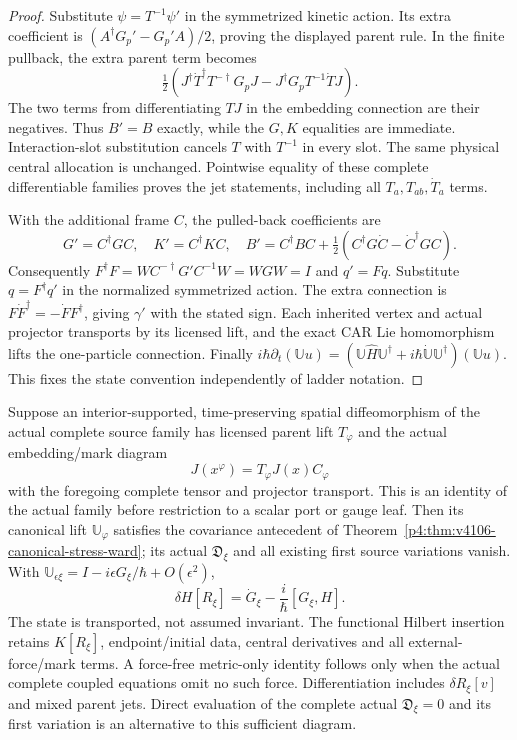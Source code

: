 \documentclass[12pt,a4paper]{article}
\begin{document}
\begin{proof}
Substitute $\psi=T^{-1}\psi'$ in the symmetrized kinetic action. Its
extra coefficient is $(A^\dagger G_p'-G_p'A)/2$, proving the displayed
parent rule. In the finite pullback, the extra parent term becomes
\[
 \tfrac12(J^\dagger\dot T^\dagger T^{-\dagger}G_pJ
                    -J^\dagger G_pT^{-1}\dot TJ).
\]
The two terms from differentiating $TJ$ in the embedding connection
are their negatives. Thus $B'=B$ exactly, while the $G,K$ equalities
are immediate. Interaction-slot substitution cancels $T$ with $T^{-1}$
in every slot. The same physical central allocation is unchanged.
Pointwise equality of these complete differentiable families proves
the jet statements, including all $T_a,T_{ab},\dot T_a$ terms.

With the additional frame $C$, the pulled-back coefficients are
\[
 G'=C^\dagger GC,\quad K'=C^\dagger KC,\quad
 B'=C^\dagger BC+\tfrac12(C^\dagger G\dot C-\dot C^\dagger GC).
\]
Consequently
$F^\dagger F=WC^{-\dagger}G'C^{-1}W=WGW=I$ and $q'=Fq$.
Substitute $q=F^\dagger q'$ in the normalized symmetrized action.
The extra connection is $F\dot F^\dagger=-\dot FF^\dagger$,
giving $\gamma'$ with the stated sign. Each inherited vertex and
actual projector transports by its licensed lift, and the exact CAR
Lie homomorphism lifts the one-particle connection. Finally
$i\hbar\partial_t(\mathbb Uu)=
(\mathbb U\widehat H\mathbb U^\dagger+
i\hbar\dot{\mathbb U}\mathbb U^\dagger)(\mathbb Uu)$.
This fixes the state convention independently of ladder notation.
\end{proof}

\begin{corollary}
\label{p4:cor:v4118-source-bound-spatial-ward}
Suppose an interior-supported, time-preserving spatial diffeomorphism
of the actual complete source family has licensed parent lift $T_\varphi$
and the actual embedding/mark diagram
\[
 J(x^\varphi)=T_\varphi J(x)C_\varphi
\]
with the foregoing complete tensor and projector transport. This is an
identity of the actual family before restriction to a scalar port or
gauge leaf. Then its canonical lift $\mathbb U_\varphi$ satisfies the
covariance antecedent of Theorem~\ref{p4:thm:v4106-canonical-stress-ward};
its actual $\mathfrak D_\xi$ and all existing first source variations
vanish. With $\mathbb U_{\epsilon\xi}=I-i\epsilon G_\xi/\hbar+
O(\epsilon^2)$,
\[
 \delta H[R_\xi]=\dot G_\xi-\frac{i}{\hbar}[G_\xi,H].
\]
The state is transported, not assumed invariant. The functional Hilbert
insertion retains $K[R_\xi]$, endpoint/initial data, central derivatives
and all external-force/mark terms. A force-free metric-only identity
follows only when the actual complete coupled equations omit no such
force. Differentiation includes $\delta R_\xi[v]$ and mixed parent jets.
Direct evaluation of the complete actual $\mathfrak D_\xi=0$ and its
first variation is an alternative to this sufficient diagram.
\end{corollary}
\end{document}
